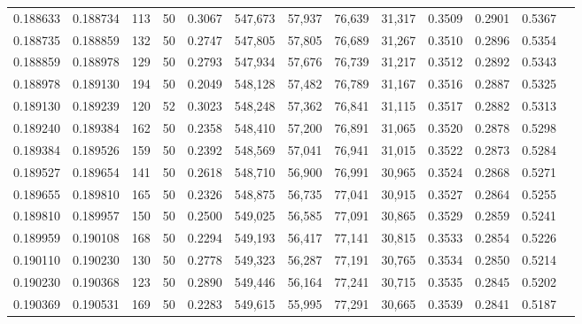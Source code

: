 \begin{tabular}{rrrrrrrrrrrrr}
0.188633 & 0.188734 &   113 &  50 &                                     0.3067 & 547,673 &  57,937 &  76,639 &  31,317 & 0.3509 & 0.2901 & 0.5367 \\
0.188735 & 0.188859 &   132 &  50 &                                     0.2747 & 547,805 &  57,805 &  76,689 &  31,267 & 0.3510 & 0.2896 & 0.5354 \\
0.188859 & 0.188978 &   129 &  50 &                                     0.2793 & 547,934 &  57,676 &  76,739 &  31,217 & 0.3512 & 0.2892 & 0.5343 \\
0.188978 & 0.189130 &   194 &  50 &                                     0.2049 & 548,128 &  57,482 &  76,789 &  31,167 & 0.3516 & 0.2887 & 0.5325 \\
0.189130 & 0.189239 &   120 &  52 &                                     0.3023 & 548,248 &  57,362 &  76,841 &  31,115 & 0.3517 & 0.2882 & 0.5313 \\
0.189240 & 0.189384 &   162 &  50 &                                     0.2358 & 548,410 &  57,200 &  76,891 &  31,065 & 0.3520 & 0.2878 & 0.5298 \\
0.189384 & 0.189526 &   159 &  50 &                                     0.2392 & 548,569 &  57,041 &  76,941 &  31,015 & 0.3522 & 0.2873 & 0.5284 \\
0.189527 & 0.189654 &   141 &  50 &                                     0.2618 & 548,710 &  56,900 &  76,991 &  30,965 & 0.3524 & 0.2868 & 0.5271 \\
0.189655 & 0.189810 &   165 &  50 &                                     0.2326 & 548,875 &  56,735 &  77,041 &  30,915 & 0.3527 & 0.2864 & 0.5255 \\
0.189810 & 0.189957 &   150 &  50 &                                     0.2500 & 549,025 &  56,585 &  77,091 &  30,865 & 0.3529 & 0.2859 & 0.5241 \\
0.189959 & 0.190108 &   168 &  50 &                                     0.2294 & 549,193 &  56,417 &  77,141 &  30,815 & 0.3533 & 0.2854 & 0.5226 \\
0.190110 & 0.190230 &   130 &  50 &                                     0.2778 & 549,323 &  56,287 &  77,191 &  30,765 & 0.3534 & 0.2850 & 0.5214 \\
0.190230 & 0.190368 &   123 &  50 &                                     0.2890 & 549,446 &  56,164 &  77,241 &  30,715 & 0.3535 & 0.2845 & 0.5202 \\
0.190369 & 0.190531 &   169 &  50 &                                     0.2283 & 549,615 &  55,995 &  77,291 &  30,665 & 0.3539 & 0.2841 & 0.5187 \\

\end{tabular}
